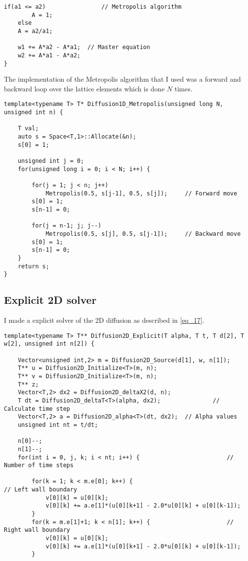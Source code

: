 \documentclass[11pt,english,a4paper]{article}
\begin{document}
\begin{flushleft}
\begin{lstlisting}[title={\texttt{Metropolis}}]
	if(a1 <= a2)				// Metropolis algorithm
		A = 1;
	else
	A = a2/a1;
	
	w1 += A*a2 - A*a1;	// Master equation
	w2 += A*a1 - A*a2;
}
\end{lstlisting}

The implementation of the Metropolis algorithm that I used was a forward and backward loop over the lattice elements which is done $N$ times.

\begin{lstlisting}[title={\texttt{Diffusion1D\_Metropolis}}]
template<typename T> T* Diffusion1D_Metropolis(unsigned long N, unsigned int n) {
	
	T val;
	auto s = Space<T,1>::Allocate(&n);
	s[0] = 1;
	
	unsigned int j = 0;
	for(unsigned long i = 0; i < N; i++) {

		for(j = 1; j < n; j++)
			Metropolis(0.5, s[j-1], 0.5, s[j]);		// Forward move
		s[0] = 1;
		s[n-1] = 0;
		
		for(j = n-1; j; j--)
			Metropolis(0.5, s[j], 0.5, s[j-1]);		// Backward move
		s[0] = 1;
		s[n-1] = 0;
	}
	return s;
}
\end{lstlisting}

\subsection{Explicit 2D solver}

I made a explicit solver of the 2D diffusion as described in \eqref{eq_17}.

\begin{lstlisting}[title={\texttt{Diffusion2D\_Explicit}}]
template<typename T> T** Diffusion2D_Explicit(T alpha, T t, T d[2], T w[2], unsigned int n[2]) {

	Vector<unsigned int,2> m = Diffusion2D_Source(d[1], w, n[1]);
	T** u = Diffusion2D_Initialize<T>(m, n);
	T** v = Diffusion2D_Initialize<T>(m, n);
	T** z;
	Vector<T,2> dx2 = Diffusion2D_deltaX2(d, n);
	T dt = Diffusion2D_deltaT<T>(alpha, dx2);				// Calculate time step
	Vector<T,2> a = Diffusion2D_alpha<T>(dt, dx2);	// Alpha values
	unsigned int nt = t/dt;
	
	n[0]--;
	n[1]--;
	for(int i = 0, j, k; i < nt; i++) {							// Number of time steps
		
		for(k = 1; k < m.e[0]; k++) {									// Left wall boundary	
			v[0][k] = u[0][k];
			v[0][k] += a.e[1]*(u[0][k+1] - 2.0*u[0][k] + u[0][k-1]);
		}
		for(k = m.e[1]+1; k < n[1]; k++) {						// Right wall boundary					
			v[0][k] = u[0][k];
			v[0][k] += a.e[1]*(u[0][k+1] - 2.0*u[0][k] + u[0][k-1]);
		}
		

\end{lstlisting}
\end{flushleft}
\end{document}
